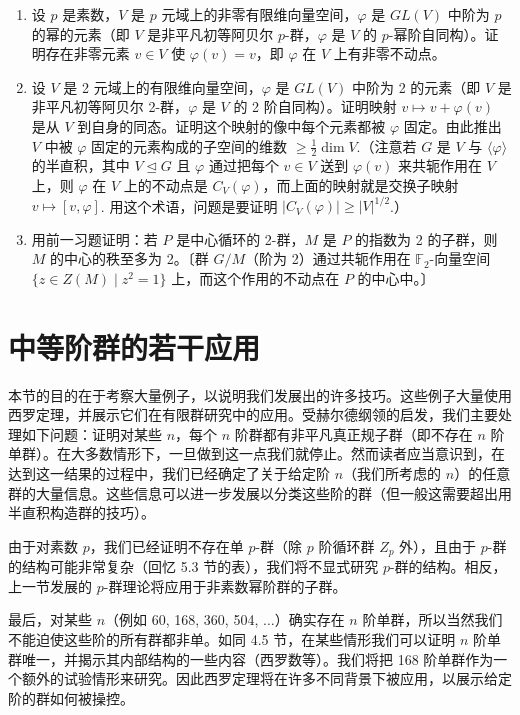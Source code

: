 \begin{enumerate}
\item 设 \(p\) 是素数，\(V\) 是 \(p\) 元域上的非零有限维向量空间，\(\varphi\) 是 \(GL(V)\) 中阶为 \(p\) 的幂的元素（即 \(V\) 是非平凡初等阿贝尔 \(p\)-群，\(\varphi\) 是 \(V\) 的 \(p\)-幂阶自同构）。证明存在非零元素 \(v \in V\) 使 \(\varphi(v) = v\)，即 \(\varphi\) 在 \(V\) 上有非零不动点。

\item 设 \(V\) 是 2 元域上的有限维向量空间，\(\varphi\) 是 \(GL(V)\) 中阶为 2 的元素（即 \(V\) 是非平凡初等阿贝尔 2-群，\(\varphi\) 是 \(V\) 的 2 阶自同构）。证明映射 \(v \mapsto v + \varphi(v)\) 是从 \(V\) 到自身的同态。证明这个映射的像中每个元素都被 \(\varphi\) 固定。由此推出 \(V\) 中被 \(\varphi\) 固定的元素构成的子空间的维数 \(\geq \frac{1}{2}\dim V\).（注意若 \(G\) 是 \(V\) 与 \(\langle \varphi \rangle\) 的半直积，其中 \(V \trianglelefteq G\) 且 \(\varphi\) 通过把每个 \(v \in V\) 送到 \(\varphi(v)\) 来共轭作用在 \(V\) 上，则 \(\varphi\) 在 \(V\) 上的不动点是 \(C_V(\varphi)\)，而上面的映射就是交换子映射 \(v \mapsto [v, \varphi]\). 用这个术语，问题是要证明 \(|C_V(\varphi)| \geq |V|^{1/2}\).）

\item 用前一习题证明：若 \(P\) 是中心循环的 2-群，\(M\) 是 \(P\) 的指数为 2 的子群，则 \(M\) 的中心的秩至多为 2。〔群 \(G/M\)（阶为 2）通过共轭作用在 \(\mathbb{F}_2\)-向量空间 \(\{z \in Z(M) \mid z^2 = 1\}\) 上，而这个作用的不动点在 \(P\) 的中心中。〕
\end{enumerate}

\section{中等阶群的若干应用}

本节的目的在于考察大量例子，以说明我们发展出的许多技巧。这些例子大量使用西罗定理，并展示它们在有限群研究中的应用。受赫尔德纲领的启发，我们主要处理如下问题：证明对某些 \(n\)，每个 \(n\) 阶群都有非平凡真正规子群（即不存在 \(n\) 阶单群）。在大多数情形下，一旦做到这一点我们就停止。然而读者应当意识到，在达到这一结果的过程中，我们已经确定了关于给定阶 \(n\)（我们所考虑的 \(n\)）的任意群的大量信息。这些信息可以进一步发展以分类这些阶的群（但一般这需要超出用半直积构造群的技巧）。

由于对素数 \(p\)，我们已经证明不存在单 \(p\)-群（除 \(p\) 阶循环群 \(Z_p\) 外），且由于 \(p\)-群的结构可能非常复杂（回忆 5.3 节的表），我们将不显式研究 \(p\)-群的结构。相反，上一节发展的 \(p\)-群理论将应用于非素数幂阶群的子群。

最后，对某些 \(n\)（例如 60, 168, 360, 504, \(\ldots\)）确实存在 \(n\) 阶单群，所以当然我们不能迫使这些阶的所有群都非单。如同 4.5 节，在某些情形我们可以证明 \(n\) 阶单群唯一，并揭示其内部结构的一些内容（西罗数等）。我们将把 168 阶单群作为一个额外的试验情形来研究。因此西罗定理将在许多不同背景下被应用，以展示给定阶的群如何被操控。

